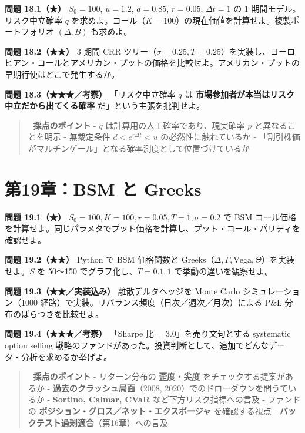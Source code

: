 \documentclass[11pt,a4paper]{report}
\begin{document}
\textbf{問題 18.1（★）} $S_0 = 100$, $u = 1.2$, $d = 0.85$, $r = 0.05$, $\Delta t = 1$ の 1 期間モデル。リスク中立確率 $q$ を求めよ。コール（$K = 100$）の現在価値を計算せよ。複製ポートフォリオ $(\Delta, B)$ も求めよ。

\textbf{問題 18.2（★★）} 3 期間 CRR ツリー（$\sigma = 0.25, T = 0.25$）を実装し、ヨーロピアン・コールとアメリカン・プットの価格を比較せよ。アメリカン・プットの早期行使はどこで発生するか。

\textbf{問題 18.3（★★★／考察）} 「リスク中立確率 $q$ は \textbf{市場参加者が本当はリスク中立だから出てくる確率} だ」という主張を批判せよ。

\begin{quote}
📝 \textbf{採点のポイント}
- $q$ は計算用の人工確率であり、現実確率 $p$ と異なることを明示
- 無裁定条件 $d < e^{r\Delta t} < u$ の必然性に触れているか
- 「割引株価がマルチンゲール」となる確率測度として位置づけているか
\end{quote}

\section{第19章：BSM と Greeks}

\textbf{問題 19.1（★）} $S_0 = 100, K = 100, r = 0.05, T = 1, \sigma = 0.2$ で BSM コール価格を計算せよ。同じパラメタでプット価格を計算し、プット・コール・パリティを確認せよ。

\textbf{問題 19.2（★★）} Python で BSM 価格関数と Greeks（$\Delta, \Gamma, \mathrm{Vega}, \Theta$）を実装せよ。$S$ を 50〜150 でグラフ化し、$T = 0.1, 1$ で挙動の違いを観察せよ。

\textbf{問題 19.3（★★／実装込み）} 離散デルタヘッジを Monte Carlo シミュレーション（1000 経路）で実装。リバランス頻度（日次／週次／月次）による P\&L 分布のばらつきを比較せよ。

\textbf{問題 19.4（★★★／考察）} 「Sharpe 比 = 3.0」を売り文句とする systematic option selling 戦略のファンドがあった。投資判断として、追加でどんなデータ・分析を求めるか挙げよ。

\begin{quote}
📝 \textbf{採点のポイント}
- リターン分布の \textbf{歪度・尖度} をチェックする提案があるか
- \textbf{過去のクラッシュ局面}（2008, 2020）でのドローダウンを問うているか
- \textbf{Sortino, Calmar, CVaR} など下方リスク指標への言及
- ファンドの \textbf{ポジション・グロス／ネット・エクスポージャ} を確認する視点
- \textbf{バックテスト過剰適合}（第16章）への言及
\end{quote}

\noindent\hrulefill
\end{document}
